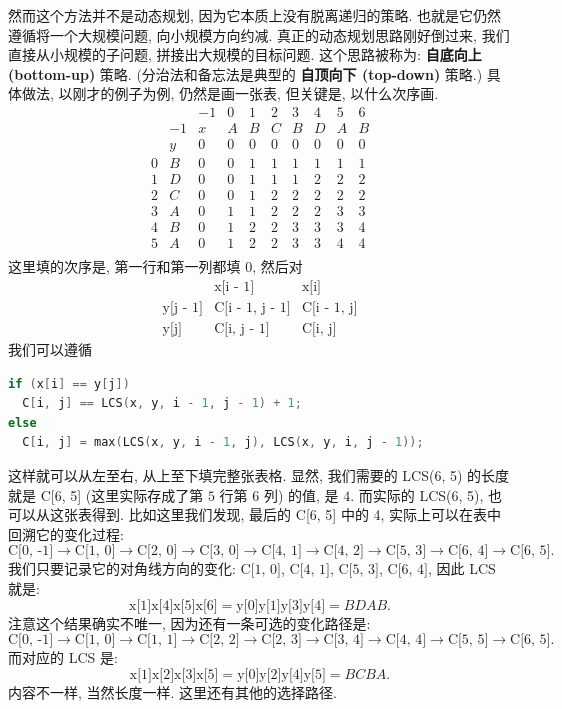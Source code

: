 \documentclass[a4paper]{ctexart}
\theoremstyle{definition}
\theoremstyle{definition}
\begin{document}
然而这个方法并不是动态规划, 因为它本质上没有脱离递归的策略. 
也就是它仍然遵循将一个大规模问题, 向小规模方向约减. 
真正的动态规划思路刚好倒过来, 我们直接从小规模的子问题, 
拼接出大规模的目标问题. 这个思路被称为: \textbf{自底向上 (bottom-up)} 策略.
(分治法和备忘法是典型的 \textbf{自顶向下 (top-down)} 策略.) 
具体做法, 以刚才的例子为例, 仍然是画一张表, 但关键是, 以什么次序画.
$$
\begin{array}{cccccccccc}
&&-1&0&1&2&3&4&5&6\\
&-1&x&A&B&C&B&D&A&B\\
&y&0&0&0&0&0&0&0&0\\
0&B&0&0&1&1&1&1&1&1\\
1&D&0&0&1&1&1&2&2&2\\
2&C&0&0&1&2&2&2&2&2\\
3&A&0&1&1&2&2&2&3&3\\
4&B&0&1&2&2&3&3&3&4\\
5&A&0&1&2&2&3&3&4&4\\
\end{array}
$$
这里填的次序是, 第一行和第一列都填 $0$, 然后对
$$
\begin{array}{ccc}
&\mbox{x[i - 1]} &\mbox{x[i]}\\
\mbox{y[j - 1]} & \mbox{C[i - 1, j - 1]} & \mbox{C[i - 1, j]}\\
\mbox{y[j]} &\mbox{C[i, j - 1]} &\mbox{C[i, j]} 
\end{array}
$$
我们可以遵循

\begin{lstlisting}[language=c++]
  if (x[i] == y[j])
  C[i, j] == LCS(x, y, i - 1, j - 1) + 1;   
else
  C[i, j] = max(LCS(x, y, i - 1, j), LCS(x, y, i, j - 1));
\end{lstlisting}

这样就可以从左至右, 从上至下填完整张表格. 显然, 
我们需要的 LCS(6, 5) 的长度就是 C[6, 5] 
(这里实际存成了第 $5$ 行第 $6$ 列) 的值, 是 $4$. 
而实际的 LCS(6, 5), 也可以从这张表得到. 
比如这里我们发现, 最后的 C[6, 5] 中的 4, 实际上可以在表中回溯它的变化过程:
$$
\mbox{C[0, -1]} \to \mbox{C[1, 0]} \to \mbox{C[2, 0]} \to \mbox{C[3, 0]} \to \mbox{C[4, 1]} \to \mbox{C[4, 2]} \to \mbox{C[5, 3]} \to \mbox{C[6, 4]} \to \mbox{C[6, 5]}.
$$
我们只要记录它的对角线方向的变化: 
$\mbox{C[1, 0]}$, $\mbox{C[4, 1]}$, $\mbox{C[5, 3]}$, $\mbox{C[6, 4]}$, 
因此 LCS 就是:
$$
\mbox{x[1]x[4]x[5]x[6]} = \mbox{y[0]y[1]y[3]y[4]}=BDAB.
$$
注意这个结果确实不唯一, 因为还有一条可选的变化路径是:
$$
\mbox{C[0, -1]} \to \mbox{C[1, 0]} \to \mbox{C[1, 1]} \to \mbox{C[2, 2]} \to \mbox{C[2, 3]} \to \mbox{C[3, 4]} \to \mbox{C[4, 4]} \to \mbox{C[5, 5]} \to \mbox{C[6, 5]}.
$$
而对应的 LCS 是:
$$
\mbox{x[1]x[2]x[3]x[5]} = \mbox{y[0]y[2]y[4]y[5]}=BCBA.
$$
内容不一样, 当然长度一样. 这里还有其他的选择路径.
\end{document}
